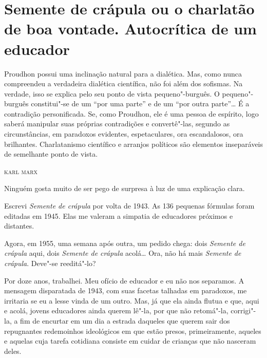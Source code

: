 \movetooddpage
\thispagestyle{empty}
\setcounter{footnote}{0}
\begin{vplace}[0.25]


{\large{}}
\end{vplace}

\pagebreak
\thispagestyle{empty}

\movetooddpage

\section{Semente de crápula ou o charlatão de boa vontade. Autocrítica de um educador}

\bigskip
\bigskip

\epigraph{Proudhon possui uma inclinação natural para a dialética. Mas, como
nunca compreendeu a verdadeira dialética científica, não foi além dos
sofismas. Na verdade, isso se explica pelo seu ponto de vista
pequeno"-burguês. O pequeno"-burguês constitui"-se de um ``por uma parte''
e de um ``por outra parte''\ldots{} É a contradição personificada. Se, como
Proudhon, ele é uma pessoa de espírito, logo saberá manipular suas
próprias contradições e convertê"-las, segundo as circunstâncias, em
paradoxos evidentes, espetaculares, ora escandalosos, ora brilhantes.
Charlatanismo científico e arranjos políticos são elementos inseparáveis
de semelhante ponto de vista.}{\textsc{karl marx}}

Ninguém gosta muito de ser pego de surpresa à luz de uma explicação
clara.

Escrevi \emph{Semente de crápula} por volta de 1943. As 136 pequenas
fórmulas foram editadas em 1945. Elas me valeram a simpatia de
educadores próximos e distantes.

Agora, em 1955, uma semana após outra, um pedido chega: dois
\emph{Semente de crápula} aqui, dois \emph{Semente de crápula}
acolá\ldots{} Ora, não há mais \emph{Semente de crápula}. Deve"-se
reeditá"-lo?

Por doze anos, trabalhei. Meu ofício de educador e eu não nos separamos.
A mensagem disparatada de 1943, com suas facetas talhadas em paradoxos,
me irritaria se eu a lesse vinda de um outro. Mas, já que ela ainda
flutua e que, aqui e acolá, jovens educadores ainda querem lê"-la, por
que não retomá"-la, corrigi"-la, a fim de encurtar em um dia a estrada
daqueles que querem sair dos repugnantes redemoinhos ideológicos em que
estão presos, primeiramente, aqueles e aquelas cuja tarefa cotidiana
consiste em cuidar de crianças que não nasceram deles.

